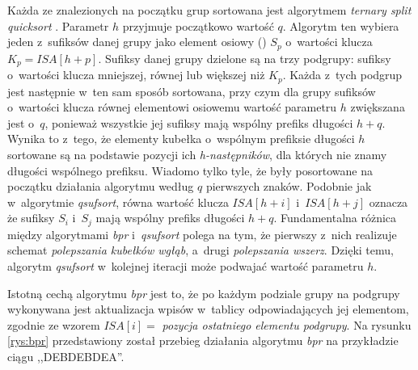 Każda ze znalezionych na początku grup sortowana jest algorytmem \emph{ternary
split quicksort} \cite{bentley-sort}. Parametr $h$ przyjmuje początkowo
wartość $q$. Algorytm ten wybiera jeden z~sufiksów danej grupy jako element
osiowy () $S_p$ o~wartości klucza $K_p = \textit{ISA}[h + p]$. Sufiksy danej grupy dzielone są na trzy
podgrupy: sufiksy o~wartości klucza mniejszej, równej lub większej niż $K_p$.
Każda z~tych podgrup jest następnie w~ten sam sposób sortowana, przy czym
dla grupy sufiksów o~wartości klucza równej elementowi osiowemu wartość
parametru $h$ zwiększana jest o~$q$, ponieważ wszystkie jej sufiksy mają
wspólny prefiks długości $h + q$. Wynika to z~tego, że elementy kubełka o~wspólnym prefiksie długości $h$ sortowane są na podstawie pozycji ich
\emph{h-następników}, dla których nie znamy długości wspólnego prefiksu.
Wiadomo tylko tyle, że były posortowane na początku działania algorytmu według
$q$ pierwszych znaków. Podobnie jak w~algorytmie \emph{qsufsort}, równa wartość
klucza $\textit{ISA}[h + i]$ i~$\textit{ISA}[h + j]$ oznacza że sufiksy $S_i$ i~$S_j$ mają wspólny prefiks długości $h+q$. Fundamentalna różnica między
algorytmami \emph{bpr} i~\emph{qsufsort} polega na tym, że pierwszy z~nich
realizuje schemat \emph{polepszania kubełków wgłąb}, a~drugi \emph{polepszania
wszerz}. Dzięki temu, algorytm \emph{qsufsort} w~kolejnej iteracji może
podwajać wartość parametru $h$.

Istotną cechą algorytmu \emph{bpr} jest to, że po każdym podziale grupy na
podgrupy wykonywana jest aktualizacja wpisów w~tablicy \ISA{} odpowiadających
jej elementom, zgodnie ze wzorem $\textit{ISA}[i] =$ \emph{pozycja
ostatniego elementu podgrupy}. Na rysunku \ref{rys:bpr} przedstawiony został
przebieg działania algorytmu \emph{bpr} na przykładzie ciągu ,,DEBDEBDEA''.

